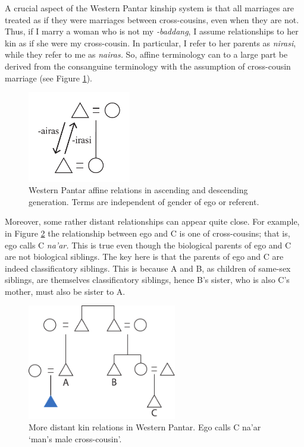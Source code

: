   A crucial aspect of the Western Pantar kinship system is that all marriages are treated as if they were marriages between cross-cousins, even when they are not. Thus, if I marry a woman who is not my \textit{-baddang}, I assume relationships to her kin as if she were my cross-cousin. In particular, I refer to her parents as \textit{nirasi}, while they refer to me as \textit{nairas.} So, affine terminology can to a large part be derived from the consanguine terminology with the assumption of cross-cousin marriage (see Figure \ref{fig:5:3}).


\begin{figure}\centering
\includegraphics[width=4.5cm]{figures/Holton_ch5_fig3.pdf}
\caption{ Western Pantar affine relations in ascending and descending generation. Terms are independent of gender of ego or referent. }
\label{fig:5:3}
\end{figure}  

Moreover, some rather distant relationships can appear quite close. For example, in Figure \ref{fig:5:4} the relationship between ego and C is one of cross-cousins; that is, ego calls C \textit{na'ar.} This is true even though the biological parents of ego and C are not biological siblings. The key here is that the parents of ego and C are indeed classificatory siblings. This is because A and B, as children of same-sex siblings, are themselves classificatory siblings, hence B's sister, who is also C's mother, must also be sister to A. 

\begin{figure}\centering
\includegraphics[width=6.5cm]{figures/Holton_ch5_fig4.pdf}
\caption{More distant kin relations in Western Pantar. Ego calls C na'ar `man's male cross-cousin'.}
\label{fig:5:4}
\end{figure}   

